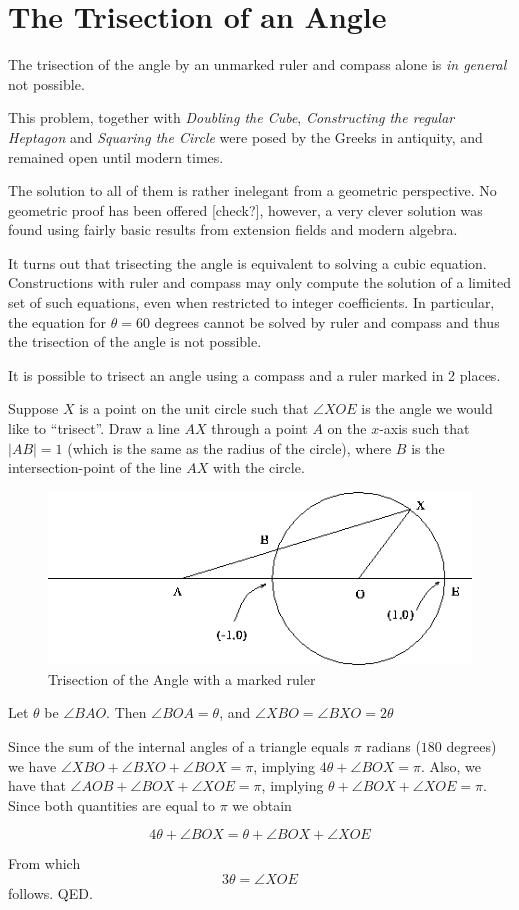 \section{The Trisection of an Angle}

\begin{teo}
  The trisection of the angle by an unmarked ruler and compass alone is
  {\em in general} not possible.
\end{teo}

This problem, together with {\em Doubling the Cube}, {\em Constructing
  the regular Heptagon} and {\em Squaring the Circle} were posed by the
Greeks in antiquity, and remained open until modern times.

The solution to all of them is rather inelegant from a geometric
perspective. No geometric proof has been offered [check?], however, a
very clever solution was found using fairly basic results from extension
fields and modern algebra.

It turns out that trisecting the angle is equivalent to solving a cubic
equation. Constructions with ruler and compass may only compute the
solution of a limited set of such equations, even when restricted to
integer coefficients. In particular, the equation for $\theta = 60$
degrees cannot be solved by ruler and compass and thus the trisection of
the angle is not possible.

It is possible to trisect an angle using a compass and a ruler marked in
2 places.

Suppose $X$ is a point on the unit circle such that $\angle XOE$ is the
angle we would like to ``trisect''. Draw a line $AX$ through a point $A$
on the $x$-axis such that $|AB| = 1$ (which is the same as the radius of
the circle), where $B$ is the intersection-point of the line $AX$ with
the circle.

\begin{figure}
  \center
  \includegraphics{figs/tri}
  \caption{Trisection of the Angle with a marked ruler}
\end{figure}


Let $\theta$ be $\angle BAO$.  Then $\angle BOA = \theta$, and $\angle
XBO = \angle BXO= 2\theta$

Since the sum of the internal angles of a triangle equals $\pi$ radians
($180$ degrees) we have $ \angle XBO + \angle BXO + \angle BOX = \pi$,
implying $4 \theta + \angle BOX = \pi$.  Also, we have that $\angle AOB
+ \angle BOX + \angle XOE = \pi$, implying $\theta +\angle BOX + \angle
XOE = \pi$. Since both quantities are equal to $\pi$ we obtain

\[
4 \theta + \angle BOX = \theta +\angle BOX + \angle XOE
\]

From which
\[
3 \theta = \angle XOE
\]
follows. QED.
